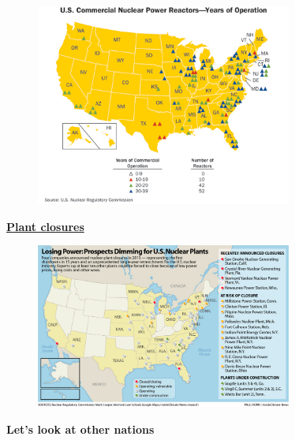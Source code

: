 \documentclass[aspectratio=1610,pdftex,dvipsnames,compress,xcolor={dvipsnames}]{beamer}
\begin{document}
\addtocounter{framenumber}{-1} 
\begin{frame}{}
    \begin{figure}
        \centering
        \includegraphics[width=0.75\textwidth]{plant.life.cycle.jpg}
    \end{figure}
\end{frame}


\begin{frame}[plain]{}
    \centering\LARGE\textbf{\href{https://uidaho.pressbooks.pub/nuclearengineering/chapter/fuel-cycle-overview/}{Plant closures}}
\end{frame}


\addtocounter{framenumber}{-1} 
\begin{frame}{}
    \begin{figure}
        \centering
        \includegraphics[width=0.75\textwidth]{plant.closures.jpg}
    \end{figure}
\end{frame}


\begin{frame}[plain]{}
    \centering\LARGE\textbf{Let's look at other nations}
\end{frame}
\end{document}

